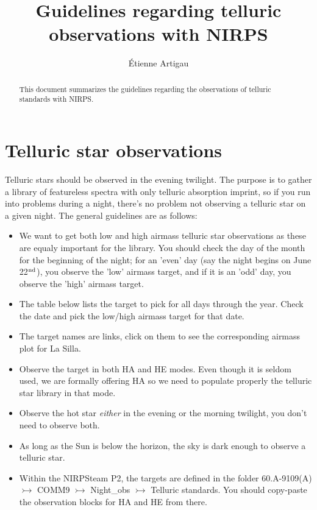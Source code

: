 \documentclass[article, trackchanges]{aastex63}
\begin{document}
\title{Guidelines regarding telluric observations with NIRPS}

\author{\'Etienne Artigau}%

 
\begin{abstract}
This document summarizes the guidelines regarding the observations of telluric standards with NIRPS.

\end{abstract}

\section{Telluric star observations}
Telluric stars should be observed in the evening twilight. The purpose is to gather a library of featureless spectra with only telluric absorption imprint, so if you run into problems during a night, there's no problem not observing a telluric star on a given night. The general guidelines are as follows:

\begin{itemize}
    \item We want to get both low and high airmass telluric star observations as these are equaly important for the library. You should check the day of the month for the beginning of the night; for an 'even' day (say the night begins on June 22$^{\rm nd}$), you observe the 'low' airmass target, and if it is an 'odd' day, you observe the 'high' airmass target.
    \item The table below lists the target to pick for all days through the year. Check the date and pick the low/high airmass target for that date.
    \item The target names are links, click on them to see the corresponding airmass plot for La Silla.
    \item Observe the target in both HA and HE modes. Even though it is seldom used, we are formally offering HA so we need to populate properly the telluric star library in that mode.
    \item Observe the hot star {\it either} in the evening or the morning twilight, you don't need to observe both.
    \item As long as the Sun is below the horizon, the sky is dark enough to observe a telluric star.
    \item Within the NIRPSteam P2, the targets are defined in the folder 60.A-9109(A) $\rightarrowtail$ COMM9 $\rightarrowtail$ Night\_obs $\rightarrowtail$ Telluric standards. You should copy-paste the observation blocks for HA and HE from there.

\end{itemize}
\end{document}
